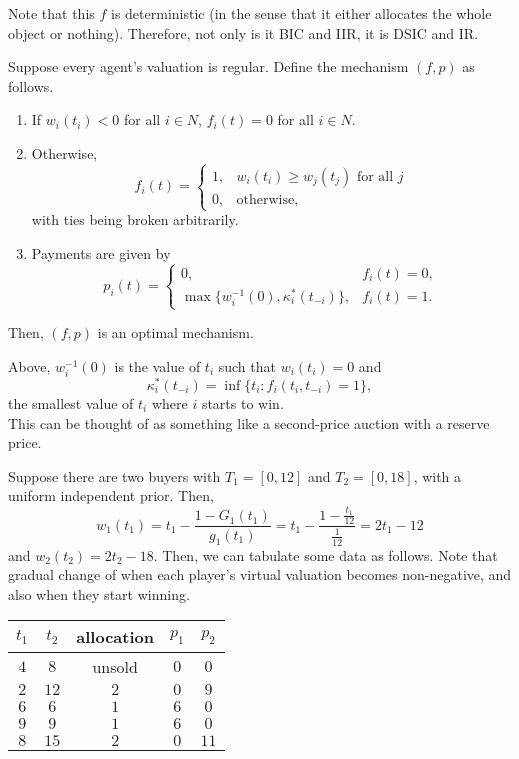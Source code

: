 		Note that this $f$ is deterministic (in the sense that it either allocates the whole object or nothing). Therefore, not only is it BIC and IIR, it is DSIC and IR.

		\begin{ftheo}
			Suppose every agent's valuation is regular. Define the mechanism $(f,p)$ as follows.
			\begin{enumerate}
				\item If $w_i(t_i) < 0$ for all $i \in N$, $f_i(t) = 0$ for all $i \in N$.
				\item Otherwise,
				\[ f_i(t) = \begin{cases} 1, & w_i(t_i) \ge w_j(t_j) \text{ for all $j$} \\ 0, & \text{otherwise,} \end{cases} \]
				with ties being broken arbitrarily.
				\item Payments are given by
				\[ p_i(t) = \begin{cases} 0, & f_i(t) = 0, \\ \max\{w_i^{-1}(0), \kappa_i^*(t_{-i})\}, & f_i(t) = 1. \end{cases} \]
			\end{enumerate}
			Then, $(f,p)$ is an optimal mechanism.
		\end{ftheo}
		Above, $w_i^{-1}(0)$ is the value of $t_i$ such that $w_i(t_i) = 0$ and
		\[ \kappa_i^*(t_{-i}) = \inf\{t_i : f_i(t_i,t_{-i}) = 1\}, \]
		the smallest value of $t_i$ where $i$ starts to win.\\
		This can be thought of as something like a second-price auction with a reserve price.

		\begin{fex}
			Suppose there are two buyers with $T_1 = [0,12]$ and $T_2 = [0,18]$, with a uniform independent prior. Then,
			\[ w_1(t_1) = t_1 - \frac{1-G_1(t_1)}{g_1(t_1)} = t_1 - \frac{1-\frac{t_1}{12}}{\frac{1}{12}} = 2t_1-12 \]
			and $w_2(t_2) = 2t_2-18$. Then, we can tabulate some data as follows. Note that gradual change of when each player's virtual valuation becomes non-negative, and also when they start winning.
			\begin{center}
			\begin{tabular}{|c|c|c|c|c|}
				\hline $t_1$ & $t_2$ & allocation & $p_1$ & $p_2$ \\ \hline\hline
				$4$ & $8$ & unsold & $0$ & $0$ \\
				$2$ & $12$ & $2$ & $0$ & $9$ \\
				$6$ & $6$ & $1$ & $6$ & $0$ \\
				$9$ & $9$ & $1$ & $6$ & $0$ \\
				$8$ & $15$ & $2$ & $0$ & $11$ \\ \hline
			\end{tabular}
			\end{center}
		\end{fex}


